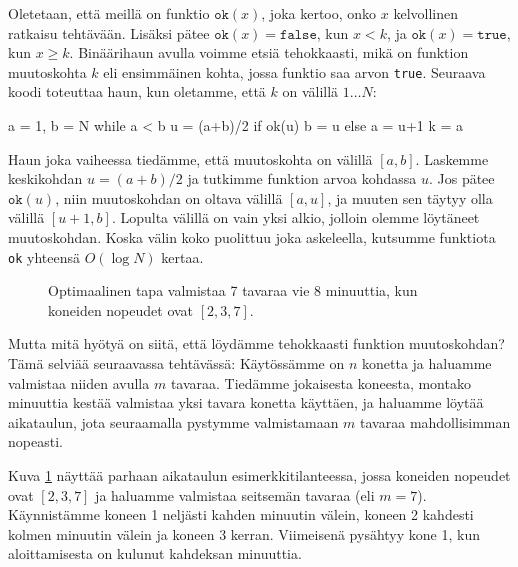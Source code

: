 Oletetaan, että meillä on funktio $\texttt{ok}(x)$,
joka kertoo, onko $x$ kelvollinen ratkaisu tehtävään.
Lisäksi pätee $\texttt{ok}(x)=\texttt{false}$, kun $x<k$,
ja $\texttt{ok}(x)=\texttt{true}$, kun $x \ge k$.
Binäärihaun avulla voimme etsiä tehokkaasti,
mikä on funktion muutoskohta $k$
eli ensimmäinen kohta, jossa funktio saa arvon \texttt{true}.
Seuraava koodi toteuttaa haun, kun oletamme, että $k$ on välillä $1 \dots N$:

\begin{code}
a = 1, b = N
while a < b
    u = (a+b)/2
    if ok(u)
        b = u
    else
        a = u+1
k = a
\end{code}

Haun joka vaiheessa tiedämme, että muutoskohta on välillä $[a,b]$.
Laskemme keskikohdan $u=(a+b)/2$ ja tutkimme funktion arvoa kohdassa $u$.
Jos pätee $\texttt{ok}(u)$, niin muutoskohdan on oltava välillä $[a,u]$,
ja muuten sen täytyy olla välillä $[u+1,b]$.
Lopulta välillä on vain yksi alkio, jolloin olemme löytäneet muutoskohdan.
Koska välin koko puolittuu joka askeleella,
kutsumme funktiota \texttt{ok} yhteensä $O(\log N)$ kertaa.

\begin{figure}
\center
{}
\caption{Optimaalinen tapa valmistaa 7 tavaraa vie 8 minuuttia,
kun koneiden nopeudet ovat $[2,3,7]$.}
\label{fig:optkon}
\end{figure}

Mutta mitä hyötyä on siitä, että löydämme tehokkaasti funktion muutoskohdan?
Tämä selviää seuraavassa tehtävässä:
Käytössämme on $n$ konetta
ja haluamme valmistaa niiden avulla $m$ tavaraa.
Tiedämme jokaisesta koneesta,
montako minuuttia kestää valmistaa yksi tavara konetta käyttäen,
ja haluamme löytää aikataulun, jota seuraamalla pystymme valmistamaan
$m$ tavaraa mahdollisimman nopeasti.

Kuva \ref{fig:optkon} näyttää parhaan aikataulun esimerkkitilanteessa,
jossa koneiden nopeudet ovat $[2,3,7]$ ja haluamme
valmistaa seitsemän tavaraa (eli $m=7$).
Käynnistämme koneen 1 neljästi kahden minuutin välein,
koneen 2 kahdesti kolmen minuutin välein ja koneen 3 kerran.
Viimeisenä pysähtyy kone 1, kun aloittamisesta
on kulunut kahdeksan minuuttia.


